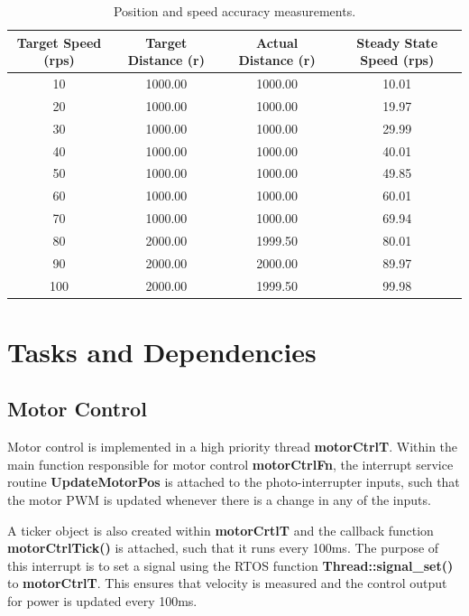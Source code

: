 \documentclass{article}
\begin{document}
\begin{table}[ht]
\centering                      %
\begin{tabular}{c c c c}        %
Target Speed (rps) & Target Distance (r) & Actual Distance (r) & Steady State Speed (rps) \\ [0.5ex]   %
\hline                          %
10 & 1000.00 & 1000.00 & 10.01 \\           %
20 & 1000.00 & 1000.00 & 19.97 \\
30 & 1000.00 & 1000.00 & 29.99 \\
40 & 1000.00 & 1000.00 & 40.01 \\
50 & 1000.00 & 1000.00 & 49.85 \\
60 & 1000.00 & 1000.00 & 60.01 \\
70 & 1000.00 & 1000.00 & 69.94 \\
80 & 2000.00 & 1999.50 & 80.01 \\
90 & 2000.00 & 2000.00 & 89.97 \\
100 & 2000.00 & 1999.50 & 99.98 \\
\end{tabular}
\caption{Position and speed accuracy measurements.}
\label{table:nonlin}            %
\end{table}

\section{Tasks and Dependencies}
\subsection{Motor Control}

\noindent
Motor control is implemented in a high priority thread \textbf{motorCtrlT}. Within the main function responsible for motor control \textbf{motorCtrlFn}, the interrupt service routine \textbf{UpdateMotorPos} is attached to the photo-interrupter inputs, such that the motor PWM is updated whenever there is a change in any of the inputs.

\bigskip

\noindent
A ticker object is also created within \textbf{motorCrtlT} and the callback function \textbf{motorCtrlTick()} is attached, such that it runs every 100ms. The purpose of this interrupt is to set a signal using the RTOS function \textbf{Thread::signal\_set()} to \textbf{motorCtrlT}. This ensures that velocity is measured and the control output for power is updated every 100ms.
\end{document}
